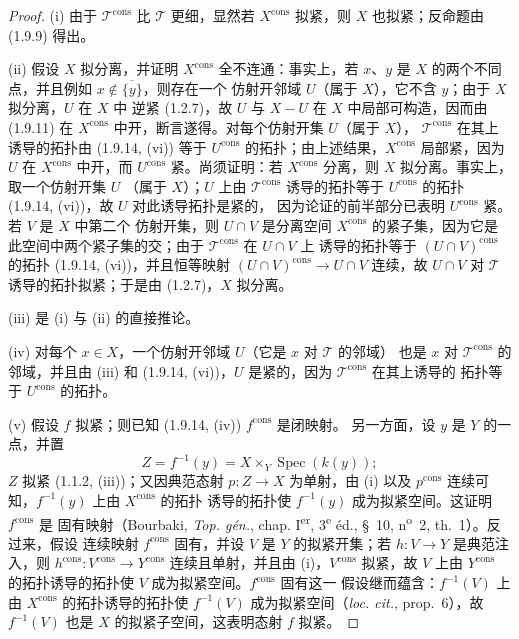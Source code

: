 \begin{proof}
(i) 由于 $\mathscr T^{\mathrm{cons}}$ 比 $\mathscr T$ 更细，显然若
$X^{\mathrm{cons}}$ 拟紧，则 $X$ 也拟紧；反命题由 (1.9.9) 得出。

(ii) 假设 $X$ 拟分离，并证明 $X^{\mathrm{cons}}$ 全不连通：事实上，若
$x$、$y$ 是 $X$ 的两个不同点，并且例如
$x\notin\overline{\{y\}}$，则存在一个
仿射开邻域 $U$（属于 $X$），它不含 $y$；由于 $X$ 拟分离，$U$ 在 $X$ 中
逆紧 (1.2.7)，故 $U$ 与 $X-U$ 在 $X$ 中局部可构造，因而由 (1.9.11)
在 $X^{\mathrm{cons}}$ 中开，断言遂得。对每个仿射开集 $U$（属于 $X$），
$\mathscr T^{\mathrm{cons}}$ 在其上诱导的拓扑由 (1.9.14, (vi)) 等于
$U^{\mathrm{cons}}$ 的拓扑；由上述结果，$X^{\mathrm{cons}}$ 局部紧，因为
$U$ 在 $X^{\mathrm{cons}}$ 中开，而 $U^{\mathrm{cons}}$ 紧。尚须证明：若
$X^{\mathrm{cons}}$ 分离，则 $X$ 拟分离。事实上，取一个仿射开集 $U$
（属于 $X$）；$U$ 上由 $\mathscr T^{\mathrm{cons}}$ 诱导的拓扑等于
$U^{\mathrm{cons}}$ 的拓扑 (1.9.14, (vi))，故 $U$ 对此诱导拓扑是紧的，
因为论证的前半部分已表明 $U^{\mathrm{cons}}$ 紧。若 $V$ 是 $X$ 中第二个
仿射开集，则 $U\cap V$ 是分离空间 $X^{\mathrm{cons}}$ 的紧子集，因为它是
此空间中两个紧子集的交；由于 $\mathscr T^{\mathrm{cons}}$ 在 $U\cap V$ 上
诱导的拓扑等于 $(U\cap V)^{\mathrm{cons}}$ 的拓扑 (1.9.14, (vi))，并且恒等映射
$(U\cap V)^{\mathrm{cons}}\to U\cap V$ 连续，故 $U\cap V$ 对
$\mathscr T$ 诱导的拓扑拟紧；于是由 (1.2.7)，$X$ 拟分离。

(iii) 是 (i) 与 (ii) 的直接推论。

(iv) 对每个 $x\in X$，一个仿射开邻域 $U$（它是 $x$ 对 $\mathscr T$ 的邻域）
也是 $x$ 对 $\mathscr T^{\mathrm{cons}}$ 的邻域，并且由 (iii) 和
(1.9.14, (vi))，$U$ 是紧的，因为 $\mathscr T^{\mathrm{cons}}$ 在其上诱导的
拓扑等于 $U^{\mathrm{cons}}$ 的拓扑。

(v) 假设 $f$ 拟紧；则已知 (1.9.14, (iv)) $f^{\mathrm{cons}}$ 是闭映射。
另一方面，设 $y$ 是 $Y$ 的一点，并置
\[
  Z=f^{-1}(y)=X\times_Y\operatorname{Spec}(k(y));
\]
$Z$ 拟紧 (1.1.2, (iii))；又因典范态射 $p:Z\to X$ 为单射，由 (i) 以及
$p^{\mathrm{cons}}$ 连续可知，$f^{-1}(y)$ 上由 $X^{\mathrm{cons}}$ 的拓扑
诱导的拓扑使 $f^{-1}(y)$ 成为拟紧空间。这证明 $f^{\mathrm{cons}}$ 是
固有映射（Bourbaki, \emph{Top. gén.}, chap. I\textsuperscript{er},
3\textsuperscript{e} éd., \S~10, n\textsuperscript{o}~2, th.~1）。反过来，假设
连续映射 $f^{\mathrm{cons}}$ 固有，并设 $V$ 是 $Y$ 的拟紧开集；若
$h:V\to Y$ 是典范注入，则 $h^{\mathrm{cons}}:V^{\mathrm{cons}}\to Y^{\mathrm{cons}}$
连续且单射，并且由 (i)，$V^{\mathrm{cons}}$ 拟紧，故 $V$ 上由
$Y^{\mathrm{cons}}$ 的拓扑诱导的拓扑使 $V$ 成为拟紧空间。$f^{\mathrm{cons}}$ 固有这一
假设继而蕴含：$f^{-1}(V)$ 上由 $X^{\mathrm{cons}}$ 的拓扑诱导的拓扑使
$f^{-1}(V)$ 成为拟紧空间（\emph{loc. cit.}, prop.~6），故 $f^{-1}(V)$ 也是
$X$ 的拟紧子空间，这表明态射 $f$ 拟紧。
\end{proof}

